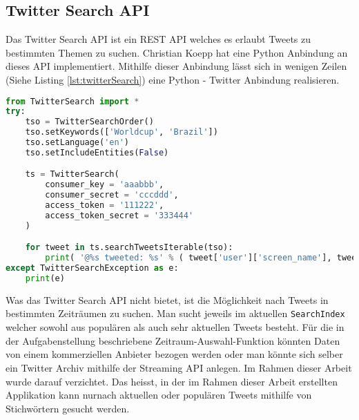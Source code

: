 \subsection{Twitter Search API}
\label{subsec:grundlagentwitter}
Das Twitter Search API\cite{twitterapi} ist ein REST API welches es erlaubt Tweets zu bestimmten Themen zu suchen. Christian Koepp hat eine Python Anbindung an dieses API implementiert\cite{twittersearch}. Mithilfe dieser Anbindung lässt sich in wenigen Zeilen (Siehe Listing \ref{lst:twitterSearch}) eine Python - Twitter Anbindung realisieren.

\begin{lstlisting}[language=Python, caption={TwitterSearch Python-Twitter Anbindung}, label={lst:twitterSearch}]
from TwitterSearch import *
try:
    tso = TwitterSearchOrder()
    tso.setKeywords(['Worldcup', 'Brazil'])
    tso.setLanguage('en')
    tso.setIncludeEntities(False)

    ts = TwitterSearch(
    	consumer_key = 'aaabbb', 
    	consumer_secret = 'cccddd', 
    	access_token = '111222', 
    	access_token_secret = '333444'
    )

    for tweet in ts.searchTweetsIterable(tso):
        print( '@%s tweeted: %s' % ( tweet['user']['screen_name'], tweet['text'] ) )
except TwitterSearchException as e:
    print(e)
\end{lstlisting}

Was das Twitter Search API nicht bietet, ist die Möglichkeit nach Tweets in bestimmten Zeiträumen zu suchen. Man sucht jeweils im aktuellen \lstinline$SearchIndex$ welcher sowohl aus populären als auch sehr aktuellen Tweets besteht. Für die in der Aufgabenstellung beschriebene Zeitraum-Auswahl-Funktion könnten Daten von einem kommerziellen Anbieter bezogen werden oder man könnte sich selber ein Twitter Archiv mithilfe der Streaming API \cite{twitterstreaming} anlegen. Im Rahmen dieser Arbeit wurde darauf verzichtet. Das heisst, in der im Rahmen dieser Arbeit erstellten Applikation kann \flqq nur\frqq nach aktuellen oder populären Tweets mithilfe von Stichwörtern gesucht werden. 